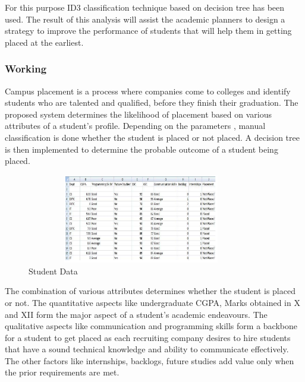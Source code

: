 \documentclass[12pt]{article}
\begin{document}
For this purpose ID3 classification technique based 
on decision tree has been used. The result of this analysis will 
assist the academic planners to design a strategy to improve 
the performance of students that will help them in getting 
placed at the earliest.

\newpage
\subsubsection{Working}
Campus placement is a process where companies come 
to colleges and identify students who are talented and 
qualified, before they finish their graduation. The proposed 
system determines the likelihood of placement based on 
various attributes of a student’s profile. Depending on the 
parameters , manual classification is done whether the 
student is placed or not placed. A decision tree is then 
implemented to determine the probable outcome of a 
student being placed.

\begin{figure}[H]
\begin{center}
 \includegraphics[width=10cm, height=3.9cm]{L2P2}
\caption{Student Data}
\end{center}
\end{figure}

The combination of various attributes determines 
whether the student is placed or not. The quantitative 
aspects like undergraduate CGPA, Marks obtained in X 
and XII form the major aspect of a student’s academic 
endeavours. The qualitative aspects like communication 
and programming skills form a backbone for a student to 
get placed as each recruiting company desires to hire 
students that have a sound technical knowledge and ability 
to communicate effectively. The other factors like 
internships, backlogs, future studies add value only when 
the prior requirements are met.
\end{document}

